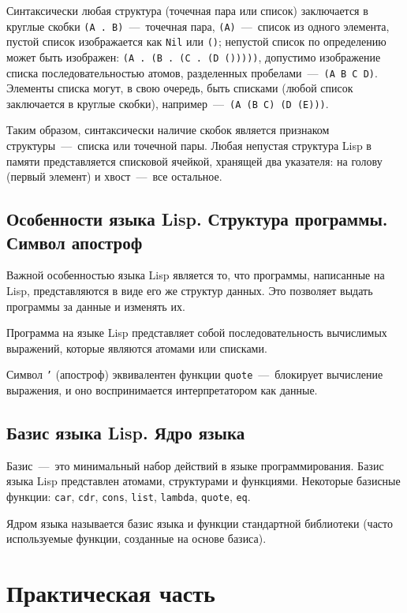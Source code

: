 Синтаксически любая структура (точечная пара или список) заключается в круглые скобки \texttt{(A . B)}~---~точечная пара, \texttt{(А)}~---~список из одного элемента,
пустой список изображается как \texttt{Nil} или \texttt{()};
непустой список по определению может быть изображен:
\texttt{(A . (B . (C . (D ()))))}, допустимо изображение списка последовательностью атомов, разделенных пробелами~---~\texttt{(A B C D)}.
Элементы списка могут, в свою очередь, быть списками (любой список заключается в круглые скобки), например~---~\texttt{(A (B C) (D (E)))}. 

Таким образом, синтаксически наличие скобок является признаком структуры~---~списка или точечной пары.
Любая непустая структура Lisp в памяти представляется списковой ячейкой, хранящей два указателя: на голову (первый элемент) и хвост~---~все остальное.

\section{Особенности языка Lisp. Структура программы. Символ апостроф}
Важной особенностью языка Lisp является то, что программы, написанные на Lisp, представляются в виде его же структур данных. Это позволяет выдать программы за данные и изменять их.

Программа на языке Lisp представляет собой последовательность вычислимых выражений, которые являются атомами или списками.

Символ \texttt{'} (апостроф) эквивалентен функции \texttt{quote}~---~блокирует вычисление выражения, и оно воспринимается интерпретатором как данные.

\section{Базис языка Lisp. Ядро языка}
Базис~---~это минимальный набор действий в языке программирования. Базис языка Lisp представлен атомами, структурами и функциями. Некоторые базисные функции: \texttt{car}, \texttt{cdr}, \texttt{cons}, \texttt{list}, \texttt{lambda}, \texttt{quote}, \texttt{eq}.

Ядром языка называется базис языка и функции стандартной библиотеки (часто используемые функции, созданные на основе базиса).

\newpage

\chapter{Практическая часть}
